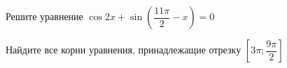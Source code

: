 \begin{ex}
	\begin{condition}
		\begin{enumcols}[label=\asbuk*)]
			\item Решите уравнение \( \cos 2x + \sin{\left(\dfrac{11\pi}{2}-x\right)} = 0 \)
			\item Найдите все корни уравнения, принадлежащие отрезку \( \left[3\pi;\dfrac{9\pi}{2}\right]  \)
		\end{enumcols}
	\end{condition}
\end{ex}